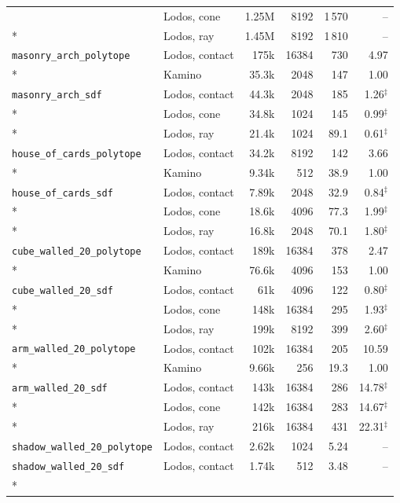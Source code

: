 \begin{longtable}{@{}llrrrr@{}}
 & Lodos, cone & 1.25M & 8192 & 1\,570 & -- \\*
 & Lodos, ray & 1.45M & 8192 & 1\,810 & -- \\
\addlinespace
\texttt{masonry\_arch\_polytope} & Lodos, contact & 175k & 16384 & 730 & 4.97 \\*
 & Kamino & 35.3k & 2048 & 147 & 1.00 \\
\addlinespace
\texttt{masonry\_arch\_sdf} & Lodos, contact & 44.3k & 2048 & 185 & 1.26$^\ddagger$ \\*
 & Lodos, cone & 34.8k & 1024 & 145 & 0.99$^\ddagger$ \\*
 & Lodos, ray & 21.4k & 1024 & 89.1 & 0.61$^\ddagger$ \\
\addlinespace
\texttt{house\_of\_cards\_polytope} & Lodos, contact & 34.2k & 8192 & 142 & 3.66 \\*
 & Kamino & 9.34k & 512 & 38.9 & 1.00 \\
\addlinespace
\texttt{house\_of\_cards\_sdf} & Lodos, contact & 7.89k & 2048 & 32.9 & 0.84$^\ddagger$ \\*
 & Lodos, cone & 18.6k & 4096 & 77.3 & 1.99$^\ddagger$ \\*
 & Lodos, ray & 16.8k & 2048 & 70.1 & 1.80$^\ddagger$ \\
\addlinespace
\texttt{cube\_walled\_20\_polytope} & Lodos, contact & 189k & 16384 & 378 & 2.47 \\*
 & Kamino & 76.6k & 4096 & 153 & 1.00 \\
\addlinespace
\texttt{cube\_walled\_20\_sdf} & Lodos, contact & 61k & 4096 & 122 & 0.80$^\ddagger$ \\*
 & Lodos, cone & 148k & 16384 & 295 & 1.93$^\ddagger$ \\*
 & Lodos, ray & 199k & 8192 & 399 & 2.60$^\ddagger$ \\
\addlinespace
\texttt{arm\_walled\_20\_polytope} & Lodos, contact & 102k & 16384 & 205 & 10.59 \\*
 & Kamino & 9.66k & 256 & 19.3 & 1.00 \\
\addlinespace
\texttt{arm\_walled\_20\_sdf} & Lodos, contact & 143k & 16384 & 286 & 14.78$^\ddagger$ \\*
 & Lodos, cone & 142k & 16384 & 283 & 14.67$^\ddagger$ \\*
 & Lodos, ray & 216k & 16384 & 431 & 22.31$^\ddagger$ \\
\addlinespace
\texttt{shadow\_walled\_20\_polytope} & Lodos, contact & 2.62k & 1024 & 5.24 & -- \\
\addlinespace
\texttt{shadow\_walled\_20\_sdf} & Lodos, contact & 1.74k & 512 & 3.48 & -- \\*

\end{longtable}
